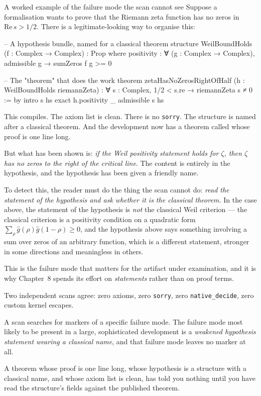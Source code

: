 \begin{deeper}{A worked example of the failure mode the scan cannot see}
Suppose a formalisation wants to prove that the Riemann zeta function has no
zeros in $\mathrm{Re}\,  s > 1/2$. There is a legitimate-looking way to organise this:

\begin{leanquote}
-- A hypothesis bundle, named for a classical theorem
structure WeilBoundHolds (f : Complex → Complex) : Prop where
  positivity : ∀ (g : Complex → Complex), admissible g →
    sumZeros f g >= 0

-- The "theorem" that does the work
theorem zetaHasNoZerosRightOfHalf (h : WeilBoundHolds riemannZeta) :
    ∀ s : Complex, 1/2 < s.re → riemannZeta s ≠ 0 := by
  intro s hs
  exact h.positivity _ admissible s hs
\end{leanquote}

This compiles. The axiom list is clean. There is no \texttt{sorry}. The
structure is named after a classical theorem. And the development now has a
theorem called  whose proof is one line long.

But what has been shown is: \emph{if the Weil positivity statement holds for
$\zeta$, then $\zeta$ has no zeros to the right of the critical line}. The
content is entirely in the hypothesis, and the hypothesis has been given a
friendly name.

To detect this, the reader must do the thing the scan cannot do: \emph{read
the statement of the hypothesis and ask whether it is the classical theorem.}
In the case above, the statement of the hypothesis is \emph{not} the classical
Weil criterion --- the classical criterion is a positivity condition on a
quadratic form $\sum_\rho \hat g(\rho)\hat g(1-\rho) \ge 0$, and the hypothesis
above says something involving a sum over zeros of an arbitrary function, which
is a different statement, stronger in some directions and meaningless in
others.
\end{deeper}

This is the failure mode that matters for the artifact under examination, and
it is why Chapter~8 spends its effort on \emph{statements} rather than on
proof terms.

\begin{keytakeaways}

\item Two independent scans agree: zero axioms, zero \texttt{sorry}, zero
\texttt{native\_decide}, zero custom kernel escapes.
\item A scan searches for markers of a specific failure mode. The failure mode
most likely to be present in a large, sophisticated development is a
\emph{weakened hypothesis statement wearing a classical name}, and that
failure mode leaves no marker at all.
\item A theorem whose proof is one line long, whose hypothesis is a structure
with a classical name, and whose axiom list is clean, has told you nothing
until you have read the structure's fields against the published theorem.
\end{keytakeaways}

